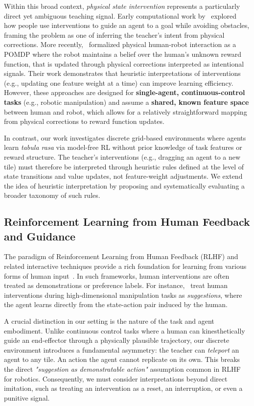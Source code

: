 \documentclass[10pt,letterpaper]{article}
\begin{document}
Within this broad context, \emph{physical state intervention} represents a particularly direct yet ambiguous teaching signal. Early computational work by~ explored how people use interventions to guide an agent to a goal while avoiding obstacles, framing the problem as one of inferring the teacher's intent from physical corrections. More recently,~ formalized physical human-robot interaction as a POMDP where the robot maintains a belief over the human's unknown reward function, that is updated through physical corrections interpreted as intentional signals. Their work demonstrates that heuristic interpretations of interventions (e.g., updating one feature weight at a time) can improve learning efficiency. However, these approaches are designed for \textbf{single-agent, continuous-control tasks} (e.g., robotic manipulation) and assume a \textbf{shared, known feature space} between human and robot, which allows for a relatively straightforward mapping from physical corrections to reward function updates.

In contrast, our work investigates discrete grid-based environments where agents learn \emph{tabula rasa} via model-free RL without prior knowledge of task features or reward structure. The teacher's interventions (e.g., dragging an agent to a new tile) must therefore be interpreted through heuristic rules defined at the level of state transitions and value updates, not feature-weight adjustments. We extend the idea of heuristic interpretation by proposing and systematically evaluating a broader taxonomy of such rules.

\subsection{Reinforcement Learning from Human Feedback and Guidance}

The paradigm of Reinforcement Learning from Human Feedback (RLHF) and related interactive techniques provide a rich foundation for learning from various forms of human input~\cite{luo2024precise}. In such frameworks, human interventions are often treated as demonstrations or preference labels. For instance,~ treat human interventions during high-dimensional manipulation tasks as \emph{suggestions}, where the agent learns directly from the state-action pair induced by the human.

A crucial distinction in our setting is the nature of the task and agent embodiment. Unlike continuous control tasks where a human can kinesthetically guide an end-effector through a physically plausible trajectory, our discrete environment introduces a fundamental asymmetry: the teacher can \emph{teleport} an agent to any tile. An action the agent cannot replicate on its own. This breaks the direct \emph{"suggestion as demonstratable action"} assumption common in RLHF for robotics. Consequently, we must consider interpretations beyond direct imitation, such as treating an intervention as a reset, an interruption, or even a punitive signal.
\end{document}
